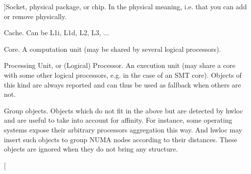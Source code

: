 \begin{Desc}
\begin{description}
{}]Socket, physical package, or chip. In the physical meaning, i.e. that you can add or remove physically. \item[{\em 
\hypertarget{a00041_ggacd37bb612667dc437d66bfb175a8dc55a56ee0b7eca88f363b75b34fdde8c9ddc}{
HWLOC\_\-OBJ\_\-CACHE}
\label{a00041_ggacd37bb612667dc437d66bfb175a8dc55a56ee0b7eca88f363b75b34fdde8c9ddc}
}]Cache. Can be L1i, L1d, L2, L3, ... \item[{\em 
\hypertarget{a00041_ggacd37bb612667dc437d66bfb175a8dc55ac793958f330bca371aa1535de8aff45f}{
HWLOC\_\-OBJ\_\-CORE}
\label{a00041_ggacd37bb612667dc437d66bfb175a8dc55ac793958f330bca371aa1535de8aff45f}
}]Core. A computation unit (may be shared by several logical processors). \item[{\em 
\hypertarget{a00041_ggacd37bb612667dc437d66bfb175a8dc55abca6887e80cb291353b0a0c1da83f661}{
HWLOC\_\-OBJ\_\-PU}
\label{a00041_ggacd37bb612667dc437d66bfb175a8dc55abca6887e80cb291353b0a0c1da83f661}
}]Processing Unit, or (Logical) Processor. An execution unit (may share a core with some other logical processors, e.g. in the case of an SMT core). Objects of this kind are always reported and can thus be used as fallback when others are not. \item[{\em 
\hypertarget{a00041_ggacd37bb612667dc437d66bfb175a8dc55a5269ef95be72f88465559d35c9b7ad56}{
HWLOC\_\-OBJ\_\-GROUP}
\label{a00041_ggacd37bb612667dc437d66bfb175a8dc55a5269ef95be72f88465559d35c9b7ad56}
}]Group objects. Objects which do not fit in the above but are detected by hwloc and are useful to take into account for affinity. For instance, some operating systems expose their arbitrary processors aggregation this way. And hwloc may insert such objects to group NUMA nodes according to their distances. These objects are ignored when they do not bring any structure. \item[{\em 
}
\end{description}
\end{Desc}
